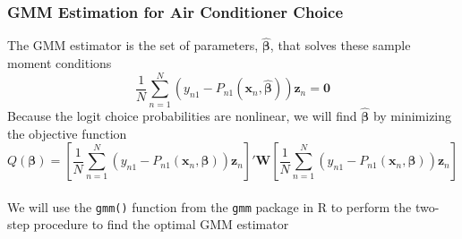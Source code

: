 \documentclass{beamer}\usepackage[]{graphicx}\usepackage[]{xcolor}
\begin{document}
\begin{frame}\frametitle{GMM Estimation for Air Conditioner Choice}
    The GMM estimator is the set of parameters, $\widehat{\bm{\beta}}$, that solves these sample moment conditions
    $$\frac{1}{N} \sum_{n = 1}^N \left( y_{n1} - P_{n1}(\bm{x}_n, \widehat{\bm{\beta}}) \right) \bm{z}_n = \bm{0}$$
    Because the logit choice probabilities are nonlinear, we will find $\widehat{\bm{\beta}}$ by minimizing the objective function 
    $$Q(\bm{\beta}) = \left[ \frac{1}{N} \sum_{n = 1}^N \left( y_{n1} - P_{n1}(\bm{x}_n, \bm{\beta}) \right) \bm{z}_n \right]' \bm{W} \left[ \frac{1}{N} \sum_{n = 1}^N \left( y_{n1} - P_{n1}(\bm{x}_n, \bm{\beta}) \right) \bm{z}_n \right]$$ \\
    \vspace{3ex}
    We will use the \texttt{gmm()} function from the \texttt{gmm} package in R to perform the two-step procedure to find the optimal GMM estimator
\end{frame}
\end{document}
